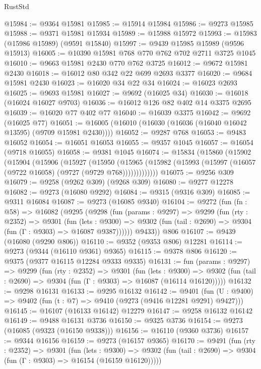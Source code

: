 \begin{lexlean}{RustStd}
\begin{coremodule}
{\begin{coremodule}
{{{{{{{{{{{{{{{{{{{{{{{{{{{{{{{{{{{{{{{{{{{{{{{{{{{{{{{@15984 := @9364 @15981
@15985 := @15914 @15984
@15986 := @9273 @15985
@15988 := @9371 @15981 @15934
@15989 := @15988 @15972
@15993 := @15983 (@15986 @15989) (@9591 @15840)
@15997 := @9439 @15985 @15989 (@9596 @15913)
@16005 := @10390 @15981 @768 @770 @762 @702 @2711 @3725 @1045
@16010 := @9663 @15981 @2430 @770 @762 @3725
@16012 := @9672 @15981 @2430
@16018 := @16012 @80 @342 @22 @699 @2693 @3377
@16020 := @9684 @15981 @2430
@16023 := @16020 @34 @22 @34
@16024 := @16023 @2693
@16025 := @9693 @15981
@16027 := @9692 (@16025 @34)
@16030 := @16018 (@16024 @16027 @9703)
@16036 := @16012 @126 @82 @402 @14 @3375 @2695
@16039 := @16020 @77 @402 @77
@16040 := @16039 @3375
@16042 := @9692 (@16025 @77)
@16051 := @16005 (@16010 (@16030 (@16036 (@16040 @16042 @13595) (@9709 @15981 @2430))))
@16052 := @9287 @768
@16053 := @9483 @16052
@16054 := @16051 @16053
@16055 := @9357 @1045
@16057 := @16054 (@9718 @16055)
@16058 := @9381 @1045
@16074 := @15834
    (@15860
      (@15902
        (@15904
          (@15906
            (@15927
              (@15950
                (@15965
                  (@15982 (@15993 (@15997 (@16057 (@9722 @16058) (@9727 (@9729 @768)))))))))))))
@16075 := @9256 @309
@16079 := @9258 (@9262 @309) (@9268 @309)
@16080 := @9277 @12278
@16082 := @9273 (@16080 @9292)
@16084 := @9315 (@9316 @309)
@16085 := @9311 @16084
@16087 := @9273 (@16085 @9340)
@16104 := @9272
    (fun (fn : @58) =>
    @16082
      (@9295
        (@9298
          (fun (params : @9297) =>
          @9299
            (fun (rty : @2352) =>
            @9301
              (fun (lets : @9300) =>
              @9302 (fun (tail : @2690) => @9304 (fun (Γ : @9303) => @16087 @9387))))))
        @9433))
    @806
@16107 := @9439 (@16080 (@9290 @806))
@16110 := @9352 (@9353 @806) @12281
@16114 := @9273 (@9344 (@16110 @9361) @9365)
@16115 := @9378 @806
@16120 := @9375 (@9377 @16115 @12284 @9333 @9335)
@16131 := fun (params : @9297) =>
  @9299
    (fun (rty : @2352) =>
    @9301
      (fun (lets : @9300) =>
      @9302 (fun (tail : @2690) => @9304 (fun (Γ : @9303) => @16087 (@16114 @16120)))))
@16132 := @9298 @16131
@16133 := @9295 @16132
@16142 := @9401
    (fun (U : @9400) => @9402 (fun (t : @7) => @9410 (@9273 (@9416 @12281 @9291) @9427)))
@16145 := @16107 (@16133 @16142) @12279
@16147 := @9258 @16132 @16142
@16149 := @9488 @16131 @3736
@16150 := @9325 @3736
@16154 := @9273 (@16085 (@9323 (@16150 @9338)))
@16156 := @16110 (@9360 @3736)
@16157 := @9344 @16156
@16159 := @9273 (@16157 @9365)
@16170 := @9491
    (fun (rty : @2352) =>
    @9301
      (fun (lets : @9300) =>
      @9302 (fun (tail : @2690) => @9304 (fun (Γ : @9303) => @16154 (@16159 @16120)))))
}}}}}}}}}}}}}}}}}}}}}}}}}}}}}}}}}}}}}}}}}}}}}}}}}}}}}}}
\end{coremodule}}
\end{coremodule}
\end{lexlean}
